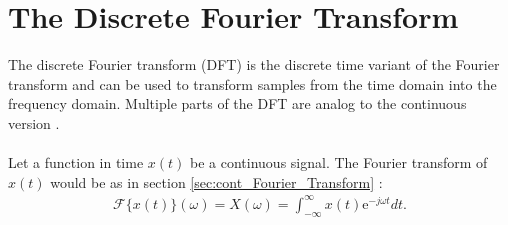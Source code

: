 \section{The Discrete Fourier Transform} \label{sec:DFT}
%
%
%
The discrete Fourier transform (DFT) is the discrete time variant of the Fourier transform and can be used to transform samples from the time domain into the frequency domain.
Multiple parts of the DFT are analog to the continuous version \cite{DFT_OX}.
\\ \\
Let a function in time $x(t)$ be a continuous signal. The Fourier transform of $x(t)$ would be as in section \ref{sec:cont_Fourier_Transform} :
\begin{align*}
	\mathcal{F}\{x(t)\}(\omega) = X(\omega) = \int_{-\infty}^\infty x(t)\text{e}^{-j\omega t} dt.
\end{align*}

%

